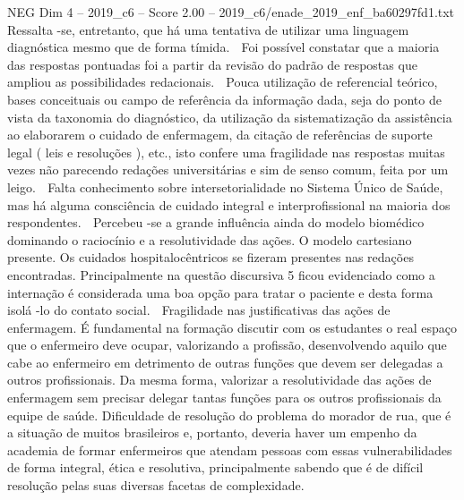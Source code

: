 \begin{textsample}{NEG Dim 4 – 2019\_c6 – Score 2.00 – 2019\_c6/enade\_2019\_enf\_ba60297fd1.txt}
Ressalta -se, entretanto, que há uma tentativa de utilizar uma linguagem diagnóstica mesmo que de forma tímida.  Foi possível constatar que a maioria das respostas pontuadas foi a partir da revisão do padrão de respostas que ampliou as possibilidades redacionais.  Pouca utilização de referencial teórico, bases conceituais ou campo de referência da informação dada, seja do ponto de vista da taxonomia do diagnóstico, da utilização da sistematização da assistência ao elaborarem o cuidado de enfermagem, da citação de referências de suporte legal ( leis e resoluções ), etc., isto confere uma fragilidade nas respostas muitas vezes não parecendo redações universitárias e sim de senso comum, feita por um leigo.  Falta conhecimento sobre intersetorialidade no Sistema Único de Saúde, mas há alguma consciência de cuidado integral e interprofissional na maioria dos respondentes.  Percebeu -se a grande influência ainda do modelo biomédico dominando o raciocínio e a resolutividade das ações.
O modelo cartesiano presente.
Os cuidados hospitalocêntricos se fizeram presentes nas redações encontradas.
Principalmente na questão discursiva 5 ficou evidenciado como a internação é considerada uma boa opção para tratar o paciente e desta forma isolá -lo do contato social.  Fragilidade nas justificativas das ações de enfermagem.
É fundamental na formação discutir com os estudantes o real espaço que o enfermeiro deve ocupar, valorizando a profissão, desenvolvendo aquilo que cabe ao enfermeiro em detrimento de outras funções que devem ser delegadas a outros profissionais.
Da mesma forma, valorizar a resolutividade das ações de enfermagem sem precisar delegar tantas funções para os outros profissionais da equipe de saúde.
Dificuldade de resolução do problema do morador de rua, que é a situação de muitos brasileiros e, portanto, deveria haver um empenho da academia de formar enfermeiros que atendam pessoas com essas vulnerabilidades de forma integral, ética e resolutiva, principalmente sabendo que é de difícil resolução pelas suas diversas facetas de complexidade.

\end{textsample}
